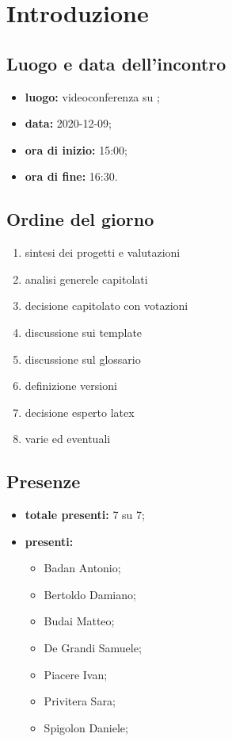 \section*{Introduzione}

\subsection*{Luogo e data dell'incontro}
\begin{itemize}
	\item \textbf{luogo:} videoconferenza su ;
	\item \textbf{data:} 2020-12-09;
	\item \textbf{ora di inizio:} 15:00;
	\item \textbf{ora di fine:} 16:30.
\end{itemize}

\subsection*{Ordine del giorno}
	\begin{enumerate}
	\item sintesi dei progetti e valutazioni
	\item analisi generele capitolati
	\item decisione capitolato con votazioni
	\item discussione sui template
	\item discussione sul glossario
	\item definizione versioni
	\item decisione esperto latex
	\item varie	ed eventuali
\end{enumerate}

\subsection*{Presenze}
\begin{itemize}
	\item \textbf{totale presenti:} 7 su 7;
	\item \textbf{presenti: }
	\begin{itemize}
		\item Badan Antonio;
		\item Bertoldo Damiano;
		\item Budai Matteo;
		\item De Grandi Samuele;
		\item Piacere Ivan;
		\item Privitera Sara;
		\item Spigolon Daniele;
	\end{itemize}
\end{itemize}

